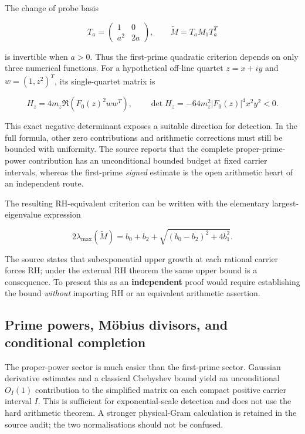 \documentclass[
  10pt,
  a4paper,
  10pt,
  oneside,
  openany]{book}
\begin{document}
The change of probe basis

\[
T_a=\begin{pmatrix}1&0\\a^2&2a\end{pmatrix},
\qquad\widetilde M=T_a M_1 T_a^T
\tag{S8.4}\label{eq:S8.4}
\]

is invertible when \(a>0\). Thus the first-prime quadratic criterion
depends on only three numerical functions. For a hypothetical off-line
quartet \(z=x+iy\) and \(w=(1,z^2)^T\), its single-quartet matrix is

\[
H_z=4m_z\Re(F_0(z)^2ww^T),\qquad
\det H_z=-64m_z^2|F_0(z)|^4x^2y^2<0.
\tag{S8.5}\label{eq:S8.5}
\]

This exact negative determinant exposes a suitable direction for
detection. In the full formula, other zero contributions and arithmetic
corrections must still be bounded with uniformity. The source reports
that the complete proper-prime-power contribution has an unconditional
bounded budget at fixed carrier intervals, whereas the first-prime
\emph{signed} estimate is the open arithmetic heart of an independent
route.

The resulting RH-equivalent criterion can be written with the elementary
largest-eigenvalue expression

\[
2\lambda_{\max}(\widetilde M)
=b_0+b_2+\sqrt{(b_0-b_2)^2+4b_1^2}.
\tag{S8.6}\label{eq:S8.6}
\]

The source states that subexponential upper growth at each rational
carrier forces RH; under the external RH theorem the same upper bound is
a consequence. To present this as an \textbf{independent} proof would
require establishing the bound \emph{without} importing RH or an
equivalent arithmetic assertion.

\subsection{Prime powers, Möbius divisors, and conditional
completion}\label{prime-powers-muxf6bius-divisors-and-conditional-completion}

The proper-power sector is much easier than the first-prime sector.
Gaussian derivative estimates and a classical Chebyshev bound yield an
unconditional \(O_I(1)\) contribution to the simplified matrix on each
compact positive carrier interval \(I\). This is sufficient for
exponential-scale detection and does not use the hard arithmetic
theorem. A stronger physical-Gram calculation is retained in the source
audit; the two normalisations should not be confused.
\end{document}
